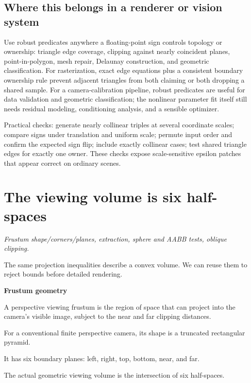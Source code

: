 \subsection{Where this belongs in a renderer or vision system}\label{02-foundations-ii-ch034-where-this-belongs-in-a-renderer-or-vision-system}

Use robust predicates anywhere a floating-point sign controls topology or ownership: triangle edge coverage, clipping against nearly coincident planes, point-in-polygon, mesh repair, Delaunay construction, and geometric classification. For rasterization, exact edge equations plus a consistent boundary ownership rule prevent adjacent triangles from both claiming or both dropping a shared sample. For a camera-calibration pipeline, robust predicates are useful for data validation and geometric classification; the nonlinear parameter fit itself still needs residual modeling, conditioning analysis, and a sensible optimizer.

Practical checks: generate nearly collinear triples at several coordinate scales; compare signs under translation and uniform scale; permute input order and confirm the expected sign flip; include exactly collinear cases; test shared triangle edges for exactly one owner. These checks expose scale-sensitive epsilon patches that appear correct on ordinary scenes.

\section{The viewing volume is six half-spaces}\label{02-foundations-ii-ch034-the-viewing-volume-is-six-half-spaces}

\emph{Frustum shape/corners/planes, extraction, sphere and AABB tests, oblique clipping.}

The same projection inequalities describe a convex volume. We can reuse them to reject bounds before detailed rendering.

\textbf{Frustum geometry}

A perspective viewing frustum is the region of space that can project into the camera's visible image, subject to the near and far clipping distances.

For a conventional finite perspective camera, its shape is a truncated rectangular pyramid.

It has six boundary planes: left, right, top, bottom, near, and far.

The actual geometric viewing volume is the intersection of six half-spaces.

